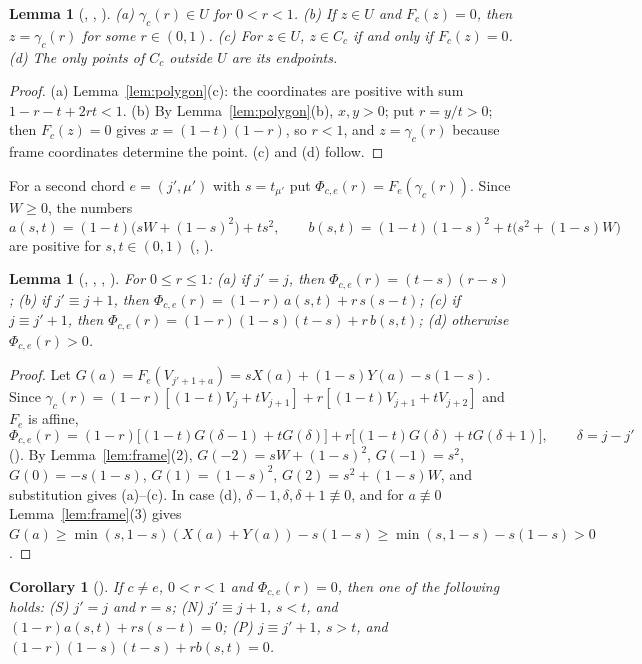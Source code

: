 \documentclass[11pt]{amsart}
\theoremstyle{plain}
\newtheorem{lemma}[theorem]{Lemma}
\newtheorem{corollary}[theorem]{Corollary}
\theoremstyle{definition}
\begin{document}
\begin{lemma}[, , ]\label{lem:line}
(a) $\gamma_c(r)\in U$ for $0<r<1$. (b) If $z\in U$ and $F_c(z)=0$, then $z=\gamma_c(r)$ for some $r\in(0,1)$. (c) For $z\in U$, $z\in C_c$ if and only if $F_c(z)=0$. (d) The only points of $C_c$ outside $U$ are its endpoints.
\end{lemma}

\begin{proof}
(a) Lemma~\ref{lem:polygon}(c): the coordinates are positive with sum $1-r-t+2rt<1$. (b) By Lemma~\ref{lem:polygon}(b), $x,y>0$; put $r=y/t>0$; then $F_c(z)=0$ gives $x=(1-t)(1-r)$, so $r<1$, and $z=\gamma_c(r)$ because frame coordinates determine the point. (c) and (d) follow.
\end{proof}

For a second chord $e=(j',\mu')$ with $s=t_{\mu'}$ put $\Phi_{c,e}(r)=F_e(\gamma_c(r))$. Since $W\ge0$, the numbers
\[
a(s,t)=(1-t)\bigl(sW+(1-s)^2\bigr)+ts^2,\qquad b(s,t)=(1-t)(1-s)^2+t\bigl(s^2+(1-s)W\bigr)
\]
are positive for $s,t\in(0,1)$ (, ).

\begin{lemma}[, , , ]\label{lem:pairs}
For $0\le r\le1$:
(a) if $j'=j$, then $\Phi_{c,e}(r)=(t-s)(r-s)$;
(b) if $j'\equiv j+1$, then $\Phi_{c,e}(r)=(1-r)\,a(s,t)+r\,s(s-t)$;
(c) if $j\equiv j'+1$, then $\Phi_{c,e}(r)=(1-r)(1-s)(t-s)+r\,b(s,t)$;
(d) otherwise $\Phi_{c,e}(r)>0$.
\end{lemma}

\begin{proof}
Let $G(a)=F_e(V_{j'+1+a})=sX(a)+(1-s)Y(a)-s(1-s)$. Since $\gamma_c(r)=(1-r)[(1-t)V_j+tV_{j+1}]+r[(1-t)V_{j+1}+tV_{j+2}]$ and $F_e$ is affine,
\[
\Phi_{c,e}(r)=(1-r)\bigl[(1-t)G(\delta-1)+tG(\delta)\bigr]+r\bigl[(1-t)G(\delta)+tG(\delta+1)\bigr],\qquad \delta=j-j'
\]
(). By Lemma~\ref{lem:frame}(2), $G(-2)=sW+(1-s)^2$, $G(-1)=s^2$, $G(0)=-s(1-s)$, $G(1)=(1-s)^2$, $G(2)=s^2+(1-s)W$, and substitution gives (a)--(c). In case (d), $\delta-1,\delta,\delta+1\not\equiv0$, and for $a\not\equiv0$ Lemma~\ref{lem:frame}(3) gives $G(a)\ge\min(s,1-s)(X(a)+Y(a))-s(1-s)\ge\min(s,1-s)-s(1-s)>0$.
\end{proof}

\begin{corollary}[]\label{cor:cls}
If $c\ne e$, $0<r<1$ and $\Phi_{c,e}(r)=0$, then one of the following holds:
(S) $j'=j$ and $r=s$;
(N) $j'\equiv j+1$, $s<t$, and $(1-r)a(s,t)+rs(s-t)=0$;
(P) $j\equiv j'+1$, $s>t$, and $(1-r)(1-s)(t-s)+rb(s,t)=0$.
\end{corollary}
\end{document}
